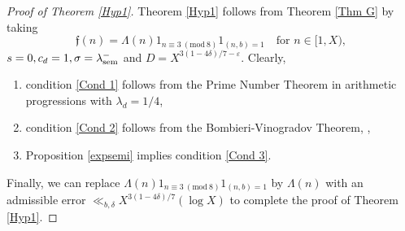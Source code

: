 \documentclass[12pt]{amsart}
\numberwithin{equation}{section}
\theoremstyle{remark}
\theoremstyle{definition}
\newcommand{\imod}[1]{\ (\mathrm{mod}\ #1)}
\begin{document}
\begin{proof}[Proof of Theorem \ref{Hyp1}] Theorem \ref{Hyp1} follows from Theorem \ref{Thm G} by taking 
\[\mathfrak{f}(n)=\Lambda(n)1_{n\equiv 3\imod 8}1_{(n, b)=1} \quad \text{for $n\in [1, X)$},\]$s=0, c_d=1, {\sigma} =\lambda_{\textup{sem}}^-$ and $D=X^{3(1-4\delta)/7-\varepsilon}$. Clearly, 
\begin{enumerate}[]
\item condition \ref{Cond 1} follows from the Prime Number Theorem in arithmetic progressions \cite[Chapters 20, 22]{dav} with $\lambda_{d}=1/4$,  \item condition \ref{Cond 2} follows from the Bombieri-Vinogradov Theorem, \cite[Chapter 28]{dav},
\item Proposition \ref{expsemi} implies condition \ref{Cond 3}.
\end{enumerate}

 Finally, we can replace $\Lambda(n)1_{n\equiv 3\imod 8}1_{(n, b)=1}$ by $\Lambda(n)$ with an admissible error $\ll_{b,\delta} X^{3(1-4\delta)/7}(\log X)$ to complete the proof of Theorem \ref{Hyp1}.
 \end{proof}
\end{document}
